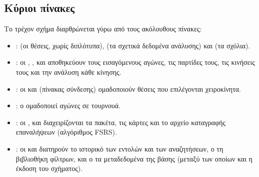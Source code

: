 \documentclass[letterpaper,10pt,greek]{sphinxmanual}
\begin{document}
\subsection{Κύριοι πίνακες}
\label{\detokenize{annexe_db_scheme:principales-tables}}
\sphinxAtStartPar
Το τρέχον σχήμα διαρθρώνεται γύρω από τους ακόλουθους πίνακες:
\begin{itemize}
\item {} 
\sphinxAtStartPar
{}:  (οι θέσεις, χωρίς διπλότυπα),  (τα σχετικά δεδομένα ανάλυσης) και  (τα σχόλια).

\item {} 
\sphinxAtStartPar
{}: οι , ,  και  αποθηκεύουν τους εισαγόμενους αγώνες, τις παρτίδες τους, τις κινήσεις τους και την ανάλυση κάθε κίνησης.

\item {} 
\sphinxAtStartPar
{}: οι  και  (πίνακας σύνδεσης) ομαδοποιούν θέσεις που επιλέγονται χειροκίνητα.

\item {} 
\sphinxAtStartPar
{}: ο  ομαδοποιεί αγώνες σε τουρνουά.

\item {} 
\sphinxAtStartPar
{}: οι ,  και  διαχειρίζονται τα πακέτα, τις κάρτες και το αρχείο καταγραφής επαναλήψεων (αλγόριθμος FSRS).

\item {} 
\sphinxAtStartPar
{}: οι  και  διατηρούν το ιστορικό των εντολών και των αναζητήσεων, ο  τη βιβλιοθήκη φίλτρων, και ο  τα μεταδεδομένα της βάσης (μεταξύ των οποίων και η έκδοση του σχήματος).

\end{itemize}
\end{document}
